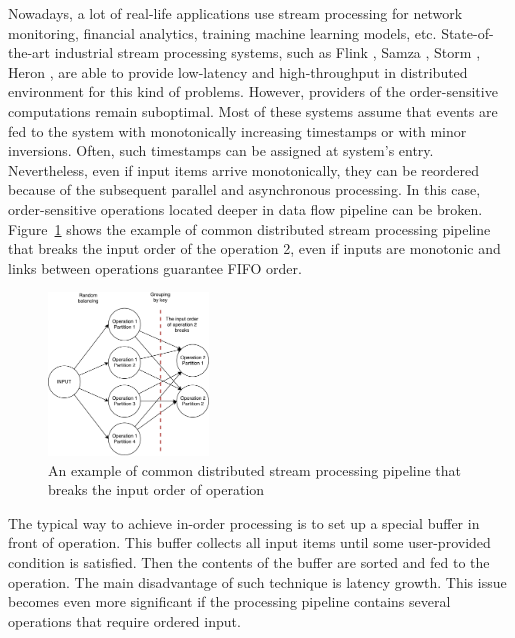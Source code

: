 
\label {fs-intro}

Nowadays, a lot of real-life applications use stream processing for network monitoring, financial analytics, training machine learning models, etc. State-of-the-art industrial stream processing systems, such as Flink \cite{carbone2015apache}, Samza \cite{Noghabi:2017:SSS:3137765.3137770}, Storm \cite{apache:storm}, Heron \cite{Kulkarni:2015:THS:2723372.2742788}, are able to provide low-latency and high-throughput in distributed environment for this kind of problems. However, providers of the order-sensitive computations remain suboptimal. Most of these systems assume that events are fed to the system with monotonically increasing timestamps or with minor inversions. Often, such timestamps can be assigned at system's entry. Nevertheless, even if input items arrive monotonically, they can be reordered because of the subsequent parallel and asynchronous processing. In this case, order-sensitive operations located deeper in data flow pipeline can be broken. Figure~\ref{break-order-dataflow} shows the example of common distributed stream processing pipeline that breaks the input order of the operation 2, even if inputs are monotonic and links between operations guarantee FIFO order.

\begin{figure}[htbp]
  \centering
  \includegraphics[width=0.38\textwidth]{pics/break_order_pipeline}
  \caption{An example of common distributed stream processing pipeline that breaks the input order of operation}
  \label {break-order-dataflow}
\end{figure}

The typical way to achieve in-order processing is to set up a special buffer in front of operation. This buffer collects all input items until some user-provided condition is satisfied. Then the contents of the buffer are sorted and fed to the operation. The main disadvantage of such technique is latency growth. This issue becomes even more significant if the processing pipeline contains several operations that require ordered input. 

